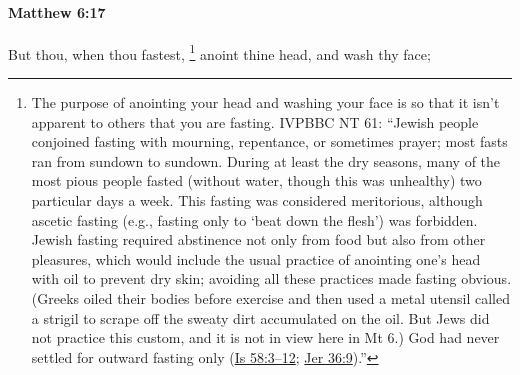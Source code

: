 			\begin{framed}
			\scriptsize
				\begin{compactdesc}
					\item[SBLG] 
				\end{compactdesc}
			\end{framed}

		\paragraph{Matthew 6:17} %
			\label{MATTHEW-6-17}

			But thou, when thou fastest,
				\footnote{%
					The purpose of anointing your head and washing your face is so that it isn't apparent to others that you are fasting. IVPBBC NT 61: ``Jewish people conjoined fasting with mourning, repentance, or sometimes prayer; most fasts ran from sundown to sundown. During at least the dry seasons, many of the most pious people fasted (without water, though this was unhealthy) two particular days a week. This fasting was considered meritorious, although ascetic fasting (e.g., fasting only to `beat down the flesh') was forbidden. Jewish fasting required abstinence not only from food but also from other pleasures, which would include the usual practice of anointing one's head with oil to prevent dry skin; avoiding all these practices made fasting obvious. (Greeks oiled their bodies before exercise and then used a metal utensil called a strigil to scrape off the sweaty dirt accumulated on the oil. But Jews did not practice this custom, and it is not in view here in Mt 6.) God had never settled for outward fasting only (\hyperref[ISAIAH-58-3]{Is 58:3--12}; \hyperref[JEREMIAH-36-9]{Jer 36:9}).''
					}%
			anoint thine head, and wash thy face;

